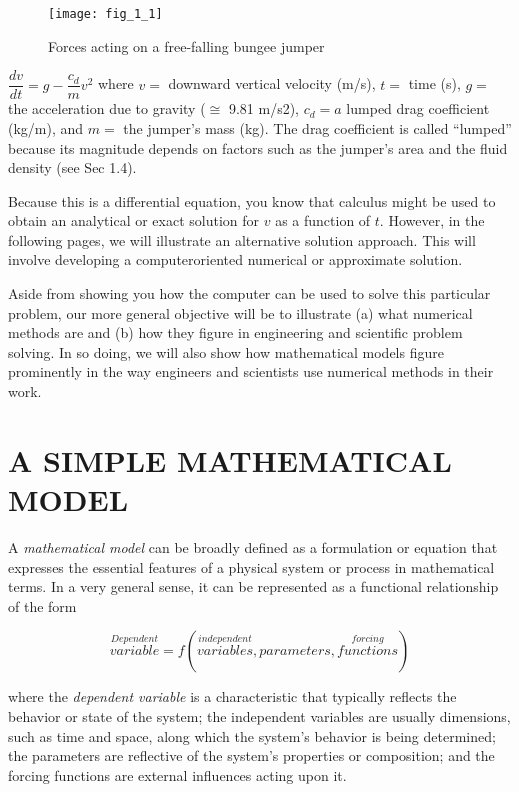 \documentclass[../main.tex]{subfiles}
\begin{document}
\begin{wrapfigure}{l}{0.25\textwidth}
    \centering
    \texttt{[image: fig\_1\_1]}
   \caption{\textsf{Forces acting on a free-falling bungee jumper}}
   \label{fig:fig_1_1}
\end{wrapfigure}

$\dfrac{dv}{dt}=g-\dfrac{c_d}{m}v^2$
where $v =$ downward vertical velocity (m/s), $t =$ time (s), $g =$ the acceleration due to
gravity ($\cong$ 9.81 m/s2), $c_d = a$ lumped drag coefficient (kg/m), and $m =$ the jumper’s
mass (kg). The drag coefficient is called “lumped” because its magnitude depends on factors such as the jumper’s area and the fluid density (see Sec 1.4).


Because this is a differential equation, you know that calculus might be used to obtain
an analytical or exact solution for $v$ as a function of $t$. However, in the following pages, we
will illustrate an alternative solution approach. This will involve developing a computeroriented numerical or approximate solution.


Aside from showing you how the computer can be used to solve this particular problem, our more general objective will be to illustrate (a) what numerical methods are and
(b) how they figure in engineering and scientific problem solving. In so doing, we will also
show how mathematical models figure prominently in the way engineers and scientists use
numerical methods in their work.


\bigskip
\section{A SIMPLE MATHEMATICAL MODEL}
\label{sec:sec1}
  A \textsl{mathematical model} can be broadly defined as a formulation or equation that expresses
the essential features of a physical system or process in mathematical terms. In a very general sense, it can be represented as a functional relationship of the form


\begin{equation}
\tag{1.1}
\overset{Dependent}{variable} = f \left( \overset{independent}{variables},parameters,\overset{forcing}{functions}\right)  
\end{equation}
 
where the \textsl{dependent variable} is a characteristic that typically reflects the behavior or state
of the system; the independent variables are usually dimensions, such as time and space,
along which the system’s behavior is being determined; the parameters are reflective of the
system's properties or composition; and the forcing functions are external influences acting
upon it.
\end{document}
